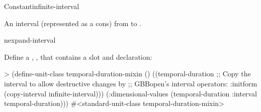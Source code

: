 \documentclass[10pt,twoside,english,pdftex]{article}
\begin{document}
\begin{functiondoc}{Constant}{infinite-interval}{}%

\fnsyntax

\fnpurpose An interval (represented as a cons) from  to
.

\fnpackage {}

\fnmodule {}

\begin{alsos}{nexpand-interval}
\end{alsos}

\fnexample
%
%
%
%
Define a , , that contains a
 slot and  declaration:
%
\W\supp
\begin{example}
> (define-unit-class temporal-duration-mixin ()
    ((temporal-duration 
       ;; Copy the interval to allow destructive changes by
       ;; GBBopen's interval operators:
       :initform (copy-interval infinite-interval)))
    (:dimensional-values
     (temporal-duration :interval temporal-duration)))
#<standard-unit-class temporal-duration-mixin>
\end{example}

\end{functiondoc}

\end{document}
